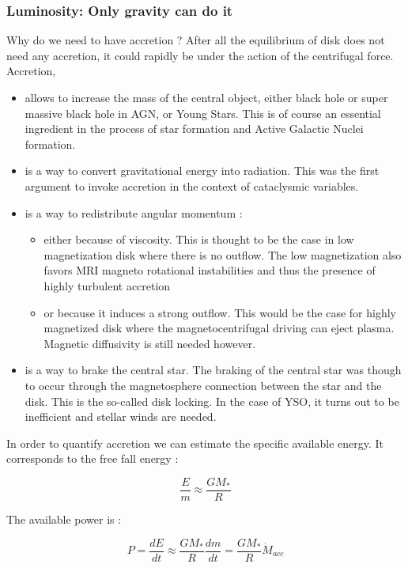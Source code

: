 \documentclass[10pt,a4paper,english]{article}
\begin{document}
\subsubsection{Luminosity: Only gravity can do it}
Why do we need to have accretion ? After all the equilibrium of disk
does not need any accretion, it could rapidly be under the action of
the centrifugal force. \\ 
Accretion, 
\begin{itemize}
\item allows to increase the mass of the central object, either black
  hole or super massive black hole in AGN, or Young Stars. This is of
  course an essential ingredient in the process of star formation and
  Active Galactic Nuclei formation. 
\item is a way to convert gravitational energy into radiation. This
  was the first argument to invoke accretion in the context of
  cataclysmic variables.
\item is a way to redistribute angular momentum : 
  \begin{itemize}
  \item either because of viscosity. This is thought to be the case in
    low magnetization disk where there is no outflow. The low
    magnetization also favors MRI magneto rotational instabilities and
    thus the presence of highly turbulent accretion
  \item or because it induces a strong outflow. This would be the case
    for highly magnetized disk where the magnetocentrifugal driving
    can eject plasma. Magnetic diffusivity is still needed however.
  \end{itemize}
  \item is a way to brake the central star. The braking of the central
    star was though to occur through the magnetosphere connection
    between the star and the disk. This is the so-called disk
    locking. In the case of YSO, it turns out to be inefficient and
    stellar winds are needed. 
\end{itemize}

In order to quantify accretion we can estimate the specific available
energy. It corresponds to the free fall energy : 

\begin{equation}
  \frac{E}{m} \approx \frac{GM_*}{R}
\end{equation}

The available power is :

\begin{equation}
P =\frac{dE}{dt} \approx \frac{GM_*}{R} \frac{dm}{dt} = \frac{GM_*}{R} \dot{M}_{acc}  
\end{equation}
\end{document}
